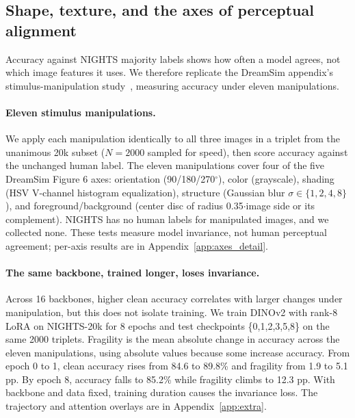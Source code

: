 \documentclass{article}
\begin{document}
\subsection{Shape, texture, and the axes of perceptual alignment}
\label{sec:shape_axes}

Accuracy against NIGHTS majority labels shows how often a model agrees, not which image features it uses. We therefore replicate the DreamSim appendix's stimulus-manipulation study~\citep{fu2023dreamsim}, measuring accuracy under eleven manipulations.

\paragraph{Eleven stimulus manipulations.} We apply each manipulation identically to all three images in a triplet from the unanimous 20k subset ($N=2000$ sampled for speed), then score accuracy against the unchanged human label. The eleven manipulations cover four of the five DreamSim Figure 6 axes: orientation (90/180/270$^\circ$), color (grayscale), shading (HSV V-channel histogram equalization), structure (Gaussian blur $\sigma\in\{1,2,4,8\}$), and foreground/background (center disc of radius 0.35$\cdot$image side or its complement). NIGHTS has no human labels for manipulated images, and we collected none. These tests measure model invariance, not human perceptual agreement; per-axis results are in Appendix~\ref{app:axes_detail}.

\paragraph{The same backbone, trained longer, loses invariance.} Across 16 backbones, higher clean accuracy correlates with larger changes under manipulation, but this does not isolate training. We train DINOv2 with rank-8 LoRA on NIGHTS-20k for 8 epochs and test checkpoints \{0,1,2,3,5,8\} on the same 2000 triplets. Fragility is the mean absolute change in accuracy across the eleven manipulations, using absolute values because some increase accuracy. From epoch 0 to 1, clean accuracy rises from 84.6 to 89.8\% and fragility from 1.9 to 5.1 pp. By epoch 8, accuracy falls to 85.2\% while fragility climbs to 12.3 pp. With backbone and data fixed, training duration causes the invariance loss. The trajectory and attention overlays are in Appendix~\ref{app:extra}.
\end{document}
